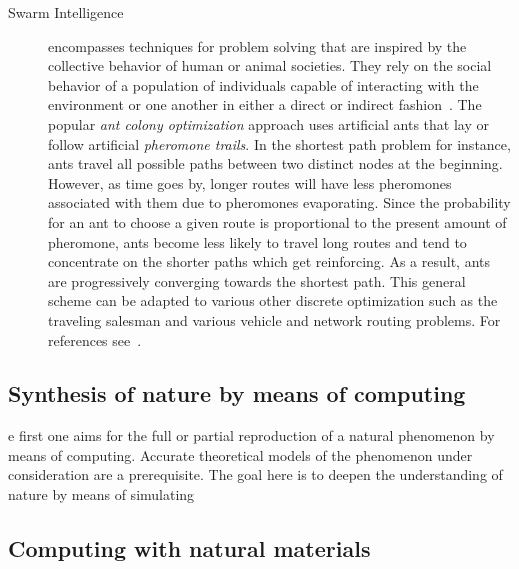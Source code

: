 \begin{description}
			\item[Swarm Intelligence] encompasses techniques for problem solving that are inspired by the collective behavior of human or animal societies. They rely on the social behavior of a population of individuals capable of interacting with the environment or one another in either a direct or indirect fashion~\cite{de2007fundamentals}. The popular \emph{ant colony optimization} approach uses artificial ants that lay or follow artificial \emph{pheromone trails}. In the shortest path problem for instance, ants travel all possible paths between two distinct nodes at the beginning. However, as time goes by, longer routes will have less pheromones associated with them due to pheromones evaporating. Since the probability for an ant to choose a given route is proportional to the present amount of pheromone, ants become less likely to travel long routes and tend to concentrate on the shorter paths which get reinforcing. As a result, ants are progressively converging towards the shortest path. This general scheme can be adapted to various other discrete optimization such as the traveling salesman and various vehicle and network routing problems. For references see~\cite{bonabeau2000swarm,bonabeau2000inspiration,Bonabeau:1999:SIN:328320,fukuyama2008fundamentals}.
			
		\end{description}

	\subsection{Synthesis of nature by means of computing}
		e first one aims for the full or partial reproduction of a natural phenomenon by means of computing. Accurate theoretical models of the phenomenon under consideration are a prerequisite. The goal here is to deepen the understanding of nature by means of simulating
	\subsection{Computing with natural materials}